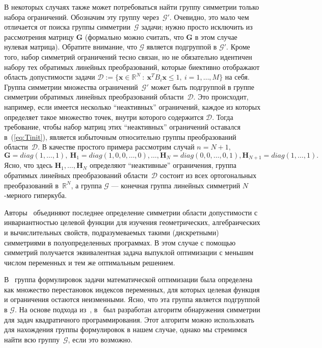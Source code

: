 В некоторых случаях также может потребоваться найти группу симметрии только набора ограничений. Обозначим эту группу через~$\mathcal G'$.
Очевидно, это мало чем отличается от поиска группы симметрии~$\mathcal G$ задачи; нужно просто исключить из рассмотрения матрицу $\textbf{G}$ (формально можно считать, что $\textbf{G}$ в этом случае нулевая матрица). Обратите внимание, что $\mathcal G$ является подгруппой в $\mathcal G'$.
{
Кроме того, набор симметрий ограничений тесно связан, но не обязательно идентичен набору тех обратимых линейных преобразований, которые биективно отображают область допустимости задачи ${\mathcal D}:=\{\textbf{x}\in {\mathbb R}^N \ : \ \textbf{x}^T B_i \textbf{x} \le 1, \ i=1,\dots,M\}$ на себя. Группа симметрии множества ограничений~$\mathcal{G}'$ может быть подгруппой в группе симметрии обратимых линейных преобразований области~${\mathcal D}$. Это происходит, например, если имеется несколько ``неактивных'' ограничений, каждое из которых определяет такое множество точек, внутри которого содержится ${\mathcal D}$. Тогда требование, чтобы набор матриц этих ``неактивных'' ограничений оставался в~(\ref{eq:Tinit}), является избыточным относительно группы преобразований области~${\mathcal D}$. В качестве простого примера рассмотрим случай $n=N+1,$ $\textbf{G}={diag}(1,\dots,1), \ \textbf{H}_1={diag}(1,0,0,\dots ,0), \dots, \textbf{H}_N={diag}(0,0,\dots,0,1), \textbf{H}_{N+1}={diag}(1,\dots,1).$ Ясно, что здесь $\textbf{H}_1,\dots,\textbf{H}_N$ определяют ``неактивные'' ограничения, группа обратимых линейных преобразований области~${\mathcal{D}}$ состоит из всех ортогональных преобразований в~${\mathbb R}^N $, а группа $\mathcal G$ — конечная группа линейных симметрий $N$-мерного гиперкуба.
}

Авторы~\cite{GATERMANN200495} объединяют последнее определение симметрии области допустимости с инвариантностью целевой функции для изучения геометрических, алгебраических и вычислительных свойств, подразумеваемых такими (дискретными) симметриями в полуопределенных программах. В этом случае с помощью симметрий получается эквивалентная задача выпуклой оптимизации с меньшим числом переменных и тем же оптимальным решением.

В~\cite{L12} группа формулировок задачи математической оптимизации была определена как множество перестановок индексов переменных, для которых целевая функция и ограничения остаются неизменными. Ясно, что эта группа является подгруппой в $\mathcal{G}$. На основе подхода из~\cite{L12}, в~\cite{KWM19} был разработан алгоритм обнаружения симметрии для задач квадратичного программирования. Этот алгоритм можно использовать для нахождения группы формулировок в нашем случае, однако мы стремимся найти всю группу~$\mathcal{G}$, если это возможно.

